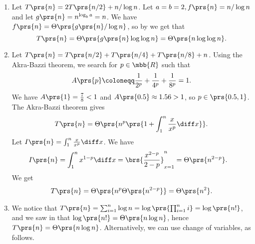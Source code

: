 \documentclass[oneside]{scrbook}
\theoremstyle{definition}
\begin{document}
\begin{problem}
\begin{enumerate}[label=\alph*.]
\item %
Let $T\prs{n} = 2T\prs{n/2} + n/\log n$.
Let $a = b = 2, f\prs{n} = n/\log n$ and let $g\prs{n} = n^{\log_b a} = n$. We have $f\prs{n} = \Theta\prs{g\prs{n} / \log n}$, so by  we get that
\[T\prs{n}  = \Theta\prs{g\prs{n} \log \log n} = \Theta\prs{n \log \log n} \text{.}\]
\item %
Let $T\prs{n} = T\prs{n/2} + T\prs{n/4} + T\prs{n/8} + n$.
Using the Akra-Bazzi theorem, we search for $p \in \mbb{R}$ such that
\begin{align*}
A\prs{p} \coloneqq \frac{1}{2^p} + \frac{1}{4^p} + \frac{1}{8^p} = 1 \text{.}
\end{align*}
We have $A\prs{1} = \frac{7}{8} < 1$ and $A\prs{0.5} \approx 1.56 > 1$, so $p \in \prs{0.5,1}$.
The Akra-Bazzi theorem gives
\begin{align*}
T\prs{n} = \Theta\prs{n^p \prs{1 + \int_1^n \frac{x}{x^p} \diff x}} \text{.}
\end{align*}
Let $I\prs{n} = \int_1^n \frac{x}{x^p} \diff x$. We have
\begin{align*}
I\prs{n} &= \int_1^n x^{1-p} \diff x = \brs{\frac{x^{2-p}}{2-p}}_{x=1}^n = \Theta\prs{n^{2-p}} \text{.}
\end{align*}
We get
\begin{align*}
T\prs{n} = \Theta\prs{n^p \Theta\prs{n^{2-p}}} = \Theta\prs{n^2} \text{.}
\end{align*}

\item %
We notice that $T\prs{n} = \sum_{i=1}^n \log n = \log\prs{\prod_{i=1}^n i} = \log\prs{n!}$, and we saw in  that $\log\prs{n!} = \Theta\prs{n \log n}$, hence $T\prs{n} = \Theta\prs{n \log n}$.
Alternatively, we can use change of variables, as follows.


\end{enumerate}
\end{problem}
\end{document}
